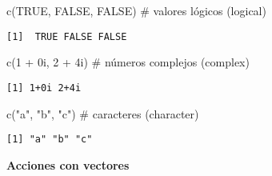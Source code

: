 \documentclass[
  a4paper,
]{article}
\newenvironment{Shaded}{}{}
\newcommand{\CommentTok}[1]{\textcolor[rgb]{0.42,0.45,0.49}{#1}}
\newcommand{\ConstantTok}[1]{\textcolor[rgb]{0.00,0.36,0.77}{#1}}
\newcommand{\DecValTok}[1]{\textcolor[rgb]{0.00,0.36,0.77}{#1}}
\newcommand{\FunctionTok}[1]{\textcolor[rgb]{0.44,0.26,0.76}{#1}}
\newcommand{\NormalTok}[1]{\textcolor[rgb]{0.14,0.16,0.18}{#1}}
\newcommand{\SpecialCharTok}[1]{\textcolor[rgb]{0.00,0.36,0.77}{#1}}
\newcommand{\StringTok}[1]{\textcolor[rgb]{0.01,0.18,0.38}{#1}}
\begin{document}
\begin{Shaded}
\begin{Highlighting}[]
\FunctionTok{c}\NormalTok{(}\ConstantTok{TRUE}\NormalTok{, }\ConstantTok{FALSE}\NormalTok{, }\ConstantTok{FALSE}\NormalTok{) }\CommentTok{\# valores lógicos (logical)}
\end{Highlighting}
\end{Shaded}

\begin{verbatim}
[1]  TRUE FALSE FALSE
\end{verbatim}

\begin{Shaded}
\begin{Highlighting}[]
\FunctionTok{c}\NormalTok{(}\DecValTok{1} \SpecialCharTok{+}\NormalTok{ 0i, }\DecValTok{2} \SpecialCharTok{+}\NormalTok{ 4i) }\CommentTok{\# números complejos (complex)}
\end{Highlighting}
\end{Shaded}

\begin{verbatim}
[1] 1+0i 2+4i
\end{verbatim}

\begin{Shaded}
\begin{Highlighting}[]
\FunctionTok{c}\NormalTok{(}\StringTok{"a"}\NormalTok{, }\StringTok{"b"}\NormalTok{, }\StringTok{"c"}\NormalTok{) }\CommentTok{\# caracteres (character)}
\end{Highlighting}
\end{Shaded}

\begin{verbatim}
[1] "a" "b" "c"
\end{verbatim}

\textbf{Acciones con vectores}
\end{document}
